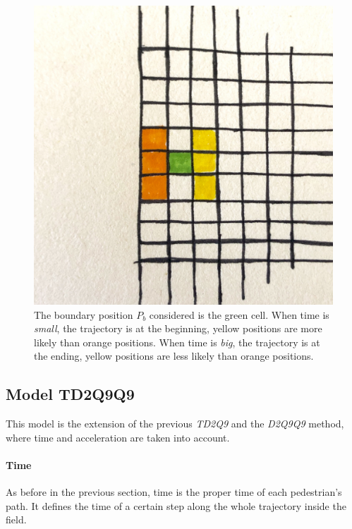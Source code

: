 \documentclass[class=article, crop=false]{standalone}
\begin{document}
\begin{figure}[h]
\centering
\includegraphics[scale=0.1]{draw/Boundary_position_in_out}
\captionsetup{width=.6\linewidth}
\caption{The boundary position $P_b$ considered is the green cell.
When time is \emph{small}, the trajectory is at the beginning, yellow positions are more likely than orange positions.
When time is \emph{big}, the trajectory is at the ending, yellow positions are less likely than orange positions.}
\label{fig:boundary_position}
\end{figure}


\FloatBarrier
\newpage
\subsection{Model TD2Q9Q9}
This model is the extension of the previous \emph{TD2Q9} and the \emph{D2Q9Q9} method, where time and acceleration are taken into account.

\paragraph{Time}
As before in the previous section, time is the proper time of each pedestrian's path.
It defines the time of a certain step along the whole trajectory inside the field.
\end{document}
